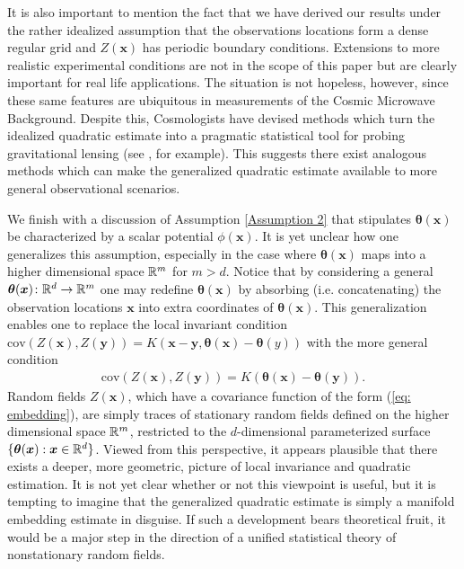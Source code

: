\documentclass[10pt,noinfoline]{imsart}
\newcommand{\bs}{\boldsymbol}
\begin{document}
It is also important to mention the fact that we have derived our results under the rather idealized assumption that the observations locations form a dense regular grid and $Z(\bs x)$ has periodic boundary conditions. Extensions to more realistic experimental conditions are not in the scope of this paper but are clearly important for real life applications. The situation is not hopeless, however, since these same features are ubiquitous in measurements of the Cosmic Microwave Background. Despite this, Cosmologists have devised methods which turn the idealized quadratic estimate into a pragmatic statistical tool for probing gravitational lensing (see \cite{namikawa2013bias,van2012measurement,planck2013lensing,planck2015lensing}, for example). This suggests there exist analogous methods which can make the generalized quadratic estimate available to more general observational scenarios.


We finish with a discussion of Assumption \ref{Assumption 2} that stipulates $\bs \theta(\bs x)$ be characterized by a scalar potential $\phi(\bs x)$.  It is yet unclear how one generalizes this assumption, especially in the case where $\bs \theta(\bs x)$ maps into a higher dimensional space $\Bbb R^m$ for $m>d$. Notice that by considering a general $\bs \theta(\bs x)\colon\Bbb R^d \rightarrow \Bbb R^m$ one may redefine $\bs\theta(\bs x)$ by absorbing (i.e. concatenating) the observation locations $\bs x$ into extra coordinates of $\bs \theta(\bs x)$. This generalization enables one to replace the local invariant condition $\text{cov}(Z(\bs x), Z(\bs y))=K(\bs x-\bs y, \bs\theta(\bs x) - \bs \theta(y))$ with the more general condition 
\begin{align}
\label{eq: embedding}
\text{cov}(Z(\bs x), Z(\bs y))=K(\bs\theta(\bs x) - \bs \theta(\bs y)).
\end{align}
Random fields $Z(\bs x)$, which have a covariance function of the form (\ref{eq: embedding}), are simply traces of stationary random fields defined on the higher dimensional space $\Bbb R^m$, restricted to the $d$-dimensional parameterized surface $\{\bs\theta(\bs x):\bs x\in\Bbb R^d\}$. Viewed from this perspective, it appears plausible that there exists a deeper, more geometric, picture of local invariance and quadratic estimation. It is not yet clear whether or not this viewpoint is useful, but it is tempting to imagine that the generalized quadratic estimate is simply a manifold embedding estimate in disguise. If such a development bears theoretical fruit, it would be a major step in the direction of a unified statistical theory of nonstationary random fields. 
\end{document}
